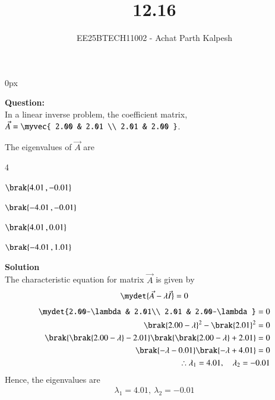 \documentclass[journal]{IEEEtran}
\begin{document}

\title{12.16}
\author{EE25BTECH11002 - Achat Parth Kalpesh }
{\let\newpage\relax\maketitle}
\renewcommand{\thefigure}{\theenumi}
\renewcommand{\thetable}{\theenumi}
\setlength{\intextsep}{10pt} %
\renewcommand{\thetable}{\theenumi}
\parindent 0px



\textbf{Question:}\\
In a linear inverse problem, the coefficient matrix, $\vec{A} = \myvec{ 2.00 & 2.01 \\ 2.01 & 2.00 }$.

         The eigenvalues of $\vec{A}$ are
            \begin{enumerate}
                \begin{multicols}{4}
                    \item $\brak{4.01\,, -0.01}$
                    \item $\brak{-4.01\,,-0.01}$
                    \item $\brak{4.01\,,0.01}$
                    \item $\brak{-4.01\,,1.01}$
                \end{multicols}
            \end{enumerate}
\textbf{Solution}\\
The characteristic equation for matrix $\vec{A}$ is given by
\begin{align}
    \mydet{\vec{A} - \lambda\vec{I}} = 0
\end{align}
\begin{align}
    \mydet{2.00-\lambda & 2.01\\ 2.01 & 2.00-\lambda} = 0\\
     \brak{2.00-\lambda}^2 - \brak{2.01}^2 = 0\\
     \brak{\brak{2.00-\lambda} - 2.01}\brak{\brak{2.00-\lambda} + 2.01} = 0\\
     \brak{-\lambda - 0.01}\brak{-\lambda + 4.01} = 0\\
     \therefore \lambda_1 = 4.01,\quad \lambda_2 = -0.01\\
\end{align}
Hence, the eigenvalues are
\begin{align}
    \lambda_1 = 4.01,\ \lambda_2 = -0.01
\end{align}
\end{document}
